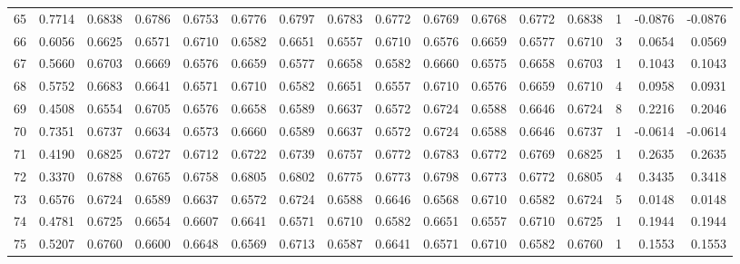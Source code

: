 \begin{tabular}{lrrrrrrrrrrrrrrr}
65  &      0.7714 &  0.6838 &  0.6786 &  0.6753 &  0.6776 &  0.6797 &  0.6783 &  0.6772 &  0.6769 &  0.6768 &   0.6772 &     0.6838 &      1 &                   -0.0876 &                    -0.0876 \\
66  &      0.6056 &  0.6625 &  0.6571 &  0.6710 &  0.6582 &  0.6651 &  0.6557 &  0.6710 &  0.6576 &  0.6659 &   0.6577 &     0.6710 &      3 &                    0.0654 &                     0.0569 \\
67  &      0.5660 &  0.6703 &  0.6669 &  0.6576 &  0.6659 &  0.6577 &  0.6658 &  0.6582 &  0.6660 &  0.6575 &   0.6658 &     0.6703 &      1 &                    0.1043 &                     0.1043 \\
68  &      0.5752 &  0.6683 &  0.6641 &  0.6571 &  0.6710 &  0.6582 &  0.6651 &  0.6557 &  0.6710 &  0.6576 &   0.6659 &     0.6710 &      4 &                    0.0958 &                     0.0931 \\
69  &      0.4508 &  0.6554 &  0.6705 &  0.6576 &  0.6658 &  0.6589 &  0.6637 &  0.6572 &  0.6724 &  0.6588 &   0.6646 &     0.6724 &      8 &                    0.2216 &                     0.2046 \\
70  &      0.7351 &  0.6737 &  0.6634 &  0.6573 &  0.6660 &  0.6589 &  0.6637 &  0.6572 &  0.6724 &  0.6588 &   0.6646 &     0.6737 &      1 &                   -0.0614 &                    -0.0614 \\
71  &      0.4190 &  0.6825 &  0.6727 &  0.6712 &  0.6722 &  0.6739 &  0.6757 &  0.6772 &  0.6783 &  0.6772 &   0.6769 &     0.6825 &      1 &                    0.2635 &                     0.2635 \\
72  &      0.3370 &  0.6788 &  0.6765 &  0.6758 &  0.6805 &  0.6802 &  0.6775 &  0.6773 &  0.6798 &  0.6773 &   0.6772 &     0.6805 &      4 &                    0.3435 &                     0.3418 \\
73  &      0.6576 &  0.6724 &  0.6589 &  0.6637 &  0.6572 &  0.6724 &  0.6588 &  0.6646 &  0.6568 &  0.6710 &   0.6582 &     0.6724 &      5 &                    0.0148 &                     0.0148 \\
74  &      0.4781 &  0.6725 &  0.6654 &  0.6607 &  0.6641 &  0.6571 &  0.6710 &  0.6582 &  0.6651 &  0.6557 &   0.6710 &     0.6725 &      1 &                    0.1944 &                     0.1944 \\
75  &      0.5207 &  0.6760 &  0.6600 &  0.6648 &  0.6569 &  0.6713 &  0.6587 &  0.6641 &  0.6571 &  0.6710 &   0.6582 &     0.6760 &      1 &                    0.1553 &                     0.1553 \\

\end{tabular}
